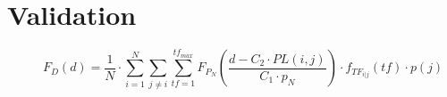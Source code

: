 \section{Validation}
\label{sec:validation}

\begin{figure}[!t]
\setcounter{equation}{11}
\begin{equation}
\label{eq:full_delay_cdf}
	F_D(d) = \frac{1}{N} \cdot \sum\limits_{i = 1}^N \sum\limits_{j \neq i} \sum\limits_{tf=1}^{tf_{max}}  F_{P_N}( \frac{d - C_2 \cdot PL(i,j)}{C_1 \cdot p_N} ) \cdot f_{TF_{i | j}}( tf ) \cdot p(j)
\end{equation}
\end{figure}
\setcounter{equation}{6}

